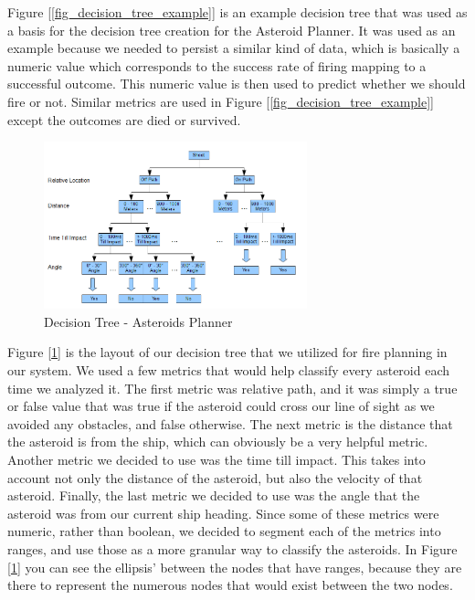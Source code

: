 \documentclass[10pt,draft,conference]{IEEEtran}
\begin{document}
Figure [\ref{fig_decision_tree_example}] is an example decision tree that was used as a basis for the decision tree creation for the Asteroid Planner\cite{wikiDecisionTreeLearning}.  It was used as an example because we needed to persist a similar kind of data, which is basically a numeric value which corresponds to the success rate of firing mapping to a successful outcome.  This numeric value is then used to predict whether we should fire or not.  Similar metrics are used in Figure [\ref{fig_decision_tree_example}] except the outcomes are died or survived.

\begin{figure}
\centering
\includegraphics[width=3.0in]{./DecisionTree.png}
\caption{Decision Tree - Asteroids Planner}
\label{fig_decision_tree_asteroids}
\end{figure}

Figure [\ref{fig_decision_tree_asteroids}] is the layout of our decision tree that we utilized for fire planning in our system.  We used a few metrics that would help classify every asteroid each time we analyzed it.  The first metric was relative path, and it was simply a true or false value that was true if the asteroid could cross our line of sight as we avoided any obstacles, and false otherwise.  The next metric is the distance that the asteroid is from the ship, which can obviously be a very helpful metric.  Another metric we decided to use was the time till impact.  This takes into account not only the distance of the asteroid, but also the velocity of that asteroid.  Finally, the last metric we decided to use was the angle that the asteroid was from our current ship heading.  Since some of these metrics were numeric, rather than boolean, we decided to segment each of the metrics into ranges, and use those as a more granular way to classify the asteroids.  In Figure [\ref{fig_decision_tree_asteroids}] you can see the ellipsis' between the nodes that have ranges, because they are there to represent the numerous nodes that would exist between the two nodes.
\end{document}
